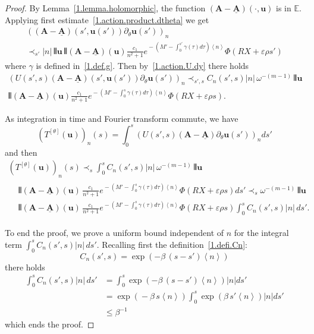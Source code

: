\documentclass[10pt]{amsart}
\theoremstyle{definition}
\theoremstyle{plain}
\newcommand*\e{\varepsilon}
\newcommand{\dptl}{\partial}%
\newcommand*\EE{{\mathbb E}}
\newcommand*\g{\gamma}
\newcommand{\ubf}{{\mathbf u}}
\newcommand*\A{{\mathbf A}}
\newcommand*\dsp{\displaystyle}
\newcommand*\und{\underline}
\DeclarePairedDelimiter{\VERT}{|\mkern -1.6mu|\mkern -1.6mu|}{|\mkern -1.6mu|\mkern -1.6mu|}
\begin{document}
\begin{proof}
By Lemma~\ref{1.lemma.holomorphic}, the function $(\A - \und{\A})(\cdot,\ubf)$ is in $\EE$. Applying first estimate~\eqref{1.action.product.dtheta} we get
\begin{multline*}
\left((\A - \und{\A})(s',\ubf(s')) \dptl_{\theta}\ubf(s')\right)_n \\
\prec_{s'} |n| \,\VERT{\ubf}\, \VERT
{({\mathbf A} - \und{{\mathbf A}})(\ubf)}
\frac{\dsp c_1}{\dsp n^2+1} e^{{}- (M' - \int_{0}^{s'}\g(\tau) d\tau) \left<n\right>} \Phi\left(R X+\e\rho s'\right)
\end{multline*}
where $\g$ is defined in~\eqref{1.def.g}. Then by~\eqref{1.action.U.dy} there holds
\begin{multline*}
\left(U(s',s) (\A - \und{\A})(s',\ubf(s')) \dptl_{\theta}\ubf(s') \right)_n \prec_{s',s} C_n(s',s) |n| \,\omega^{-(m-1)}\,\VERT{\ubf}\\
\VERT{({\mathbf A} - \und{{\mathbf A}})(\ubf)} \frac{\dsp c_1}{\dsp n^2+1}e^{{}- (M' - \int_{0}^{s}\g(\tau) d\tau) \left<n\right>} \Phi\left(R X+\e\rho s\right).
\end{multline*}


As integration in time and Fourier transform commute, we have
\[
\left(T^{[\theta]}(\ubf)\right)_n(s) = \int_{0}^{s} \left(U(s',s) (\A - \und{\A}) \dptl_{\theta}\ubf(s') \right)_n ds'
\]
and then
\begin{multline*}
\left(T^{[\theta]}(\ubf)\right)_n(s)
\prec_{s} \int_{0}^{s} C_n(s',s) |n| \,\omega^{-(m-1)}\,\VERT{\ubf} \\
\begin{aligned}
&\VERT{({\mathbf A} - \und{{\mathbf A}})(\ubf)} \,\frac{\dsp c_1}{\dsp n^2+1} e^{{}- (M'- \int_{0}^{s}\g(\tau) d\tau) \left<n\right>} \Phi\left(R X+\e\rho s\right) ds'\prec_{s} \omega^{-(m-1)}\,\VERT{\ubf}\\
& \VERT{({\mathbf A} - \und{{\mathbf A}})(\ubf)} \,\frac{\dsp c_1}{\dsp n^2+1}e^{{}- (M'- \int_{0}^{s}\g(\tau) d\tau) \left<n\right>} \Phi\left(R X+\e\rho s\right) \int_{0}^{s} C_n(s',s) |n| \, ds'.
\end{aligned}
\end{multline*}

To end the proof, we prove a uniform bound independent of $n$ for the integral term $ \int_{0}^{s} C_n(s',s) |n| \, ds'$. Recalling first the definition~\eqref{1.defi.Cn}:
\[
C_n(s',s) = \exp\left(- \beta\, (s-s') \left<n\right> \right)
\]
there holds
\begin{align*}
\int_{0}^{s} C_n(s',s) |n| \, ds' & = \int_{0}^{s} \exp\left(- \beta\, (s-s') \left<n\right> \right) |n| ds' \\
& = \exp\left({} - \beta\, s\left<n\right> \right) \int_{0}^{s} \exp\left(\beta\, s' \left<n\right> \right) |n| ds' \\
& \leq \beta^{-1}
\end{align*}
which ends the proof.
\end{proof}
\end{document}
